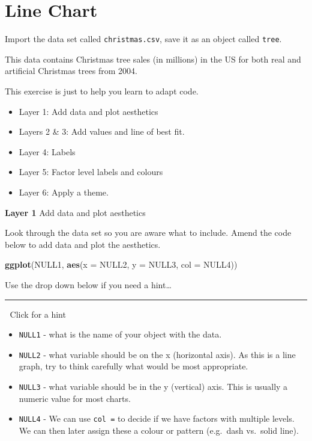 \documentclass[
]{book}
\newenvironment{Shaded}{\begin{snugshade}}{\end{snugshade}}
\newcommand{\AttributeTok}[1]{\textcolor[rgb]{0.13,0.29,0.53}{#1}}
\newcommand{\FunctionTok}[1]{\textcolor[rgb]{0.13,0.29,0.53}{\textbf{#1}}}
\newcommand{\NormalTok}[1]{#1}
\providecommand{\tightlist}{%
  \setlength{\itemsep}{0pt}\setlength{\parskip}{0pt}}
\let\oldsection\section
\renewcommand{\section}{\needspace{5\baselineskip}\oldsection}
\begin{document}
\section{Line Chart}\label{line-chart}

Import the data set called \texttt{christmas.csv}, save it as an object called \texttt{tree}.

This data contains Christmas tree sales (in millions) in the US for both real and artificial Christmas trees from 2004.

This exercise is just to help you learn to adapt code.

\begin{itemize}
\tightlist
\item
  Layer 1: Add data and plot aesthetics
\item
  Layers 2 \& 3: Add values and line of best fit.
\item
  Layer 4: Labels
\item
  Layer 5: Factor level labels and colours
\item
  Layer 6: Apply a theme.
\end{itemize}

\textbf{Layer 1} Add data and plot aesthetics

Look through the data set so you are aware what to include. Amend the code below to add data and plot the aesthetics.

\begin{Shaded}
\begin{Highlighting}[]
\FunctionTok{ggplot}\NormalTok{(NULL1, }\FunctionTok{aes}\NormalTok{(}\AttributeTok{x =}\NormalTok{ NULL2, }\AttributeTok{y =}\NormalTok{ NULL3, }\AttributeTok{col =}\NormalTok{ NULL4))}
\end{Highlighting}
\end{Shaded}

Use the drop down below if you need a hint\ldots{}

\begin{center}\rule{0.5\linewidth}{0.5pt}\end{center}

👀 Click for a hint

\begin{itemize}
\item
  \texttt{NULL1} - what is the name of your object with the data.
\item
  \texttt{NULL2} - what variable should be on the x (horizontal axis). As this is a line graph, try to think carefully what would be most appropriate.
\item
  \texttt{NULL3} - what variable should be in the y (vertical) axis. This is usually a numeric value for most charts.
\item
  \texttt{NULL4} - We can use \texttt{col\ =} to decide if we have factors with multiple levels. We can then later assign these a colour or pattern (e.g.~dash vs.~solid line).
\end{itemize}
\end{document}
